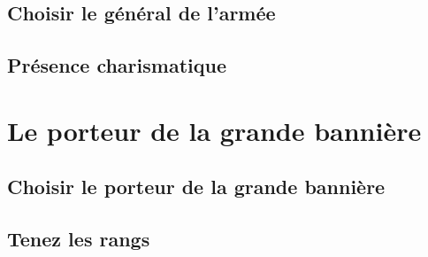 \subsection{Choisir le général de l'armée}


\subsection{Présence charismatique}


\section{Le porteur de la grande bannière}

\subsection{Choisir le porteur de la grande bannière}


\subsection{Tenez les rangs}

